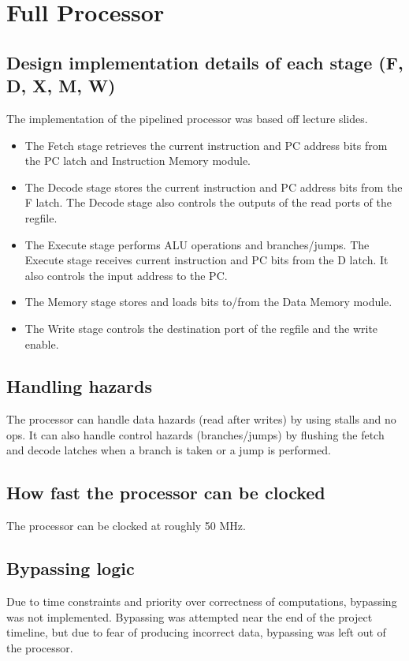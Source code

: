 \documentclass[a4paper,11pt]{article}
\begin{document}
\section{Full Processor}
\setlength{\parindent}{0cm}
\subsection*{Design implementation details of each stage (F, D, X, M, W)}

The implementation of the pipelined processor was based off lecture slides.

\begin{itemize}
    \item The Fetch stage retrieves the current instruction and PC address bits from the PC latch and Instruction Memory module.
    \item The Decode stage stores the current instruction and PC address bits from the F latch. The Decode stage also controls the outputs of the read ports of the regfile.
    \item The Execute stage performs ALU operations and branches/jumps. The Execute stage receives current instruction and PC bits from the D latch. It also controls the input address to the PC.
    \item The Memory stage stores and loads bits to/from the Data Memory module.
    \item The Write stage controls the destination port of the regfile and the write enable. \\
\end{itemize}

\subsection*{Handling hazards}
The processor can handle data hazards (read after writes) by using stalls and no ops. It can also handle control hazards (branches/jumps) by flushing the fetch and decode latches when a branch is taken or a jump is performed.

\subsection*{How fast the processor can be clocked}
The processor can be clocked at roughly 50 MHz.

\subsection*{Bypassing logic}
Due to time constraints and priority over correctness of computations, bypassing was not implemented. Bypassing was attempted near the end of the project timeline, but due to fear of producing incorrect data, bypassing was left out of the processor.
\end{document}
